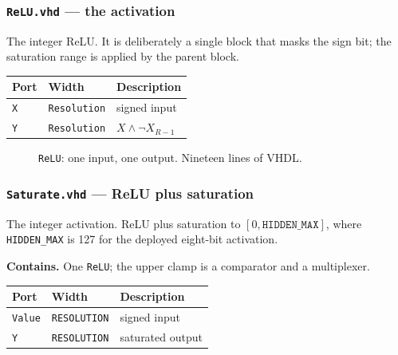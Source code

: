 \documentclass[11pt,a4paper]{article}
\begin{document}
\subsubsection{\texttt{ReLU.vhd} --- the activation}
\label{sub:relu}

The integer ReLU. It is deliberately a single block that masks the sign bit; the
saturation range is applied by the parent block.

\begin{center}
\small
\begin{tabularx}{\linewidth}{@{}llL@{}}
\toprule
\textbf{Port} & \textbf{Width} & \textbf{Description} \\
\midrule
\texttt{X} & \texttt{Resolution} & signed input \\
\texttt{Y} & \texttt{Resolution} & $X \wedge \neg X_{R-1}$ \\
\bottomrule
\end{tabularx}
\end{center}

\begin{figure}[H]
\centering
{}
\caption{\texttt{ReLU}: one input, one output. Nineteen lines of VHDL.}
\label{fig:relu}
\end{figure}

\subsubsection{\texttt{Saturate.vhd} --- ReLU plus saturation}
\label{sub:saturate}

The integer activation. ReLU plus saturation to $[0, \texttt{HIDDEN\_MAX}]$,
where \texttt{HIDDEN\_MAX} is 127 for the deployed eight-bit activation.

\textbf{Contains.} One \texttt{ReLU}; the upper clamp is a comparator and a
multiplexer.

\begin{center}
\small
\begin{tabularx}{\linewidth}{@{}llL@{}}
\toprule
\textbf{Port} & \textbf{Width} & \textbf{Description} \\
\midrule
\texttt{Value} & \texttt{RESOLUTION} & signed input \\
\texttt{Y}     & \texttt{RESOLUTION} & saturated output \\
\bottomrule
\end{tabularx}
\end{center}
\end{document}
